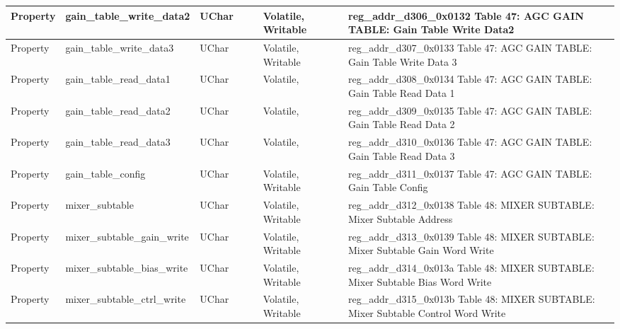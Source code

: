 \documentclass{article}
\begin{document}
\begin{scriptsize}
\begin{longtable}{|p{2cm}|p{5cm}|p{1cm}|p{2cm}|p{2cm}|p{1.75cm}|p{1.5cm}|p{5.1cm}|}
  \hline
  Property & gain\_table\_write\_data2                                & UChar &                  &                  & Volatile,  Writable &         & reg\_addr\_d306\_0x0132 Table 47: AGC GAIN TABLE: Gain Table Write Data2 \\
  \hline
  Property & gain\_table\_write\_data3                                & UChar &                  &                  & Volatile,  Writable &         & reg\_addr\_d307\_0x0133 Table 47: AGC GAIN TABLE: Gain Table Write Data 3 \\
  \hline
  Property & gain\_table\_read\_data1                                 & UChar &                  &                  & Volatile,           &         & reg\_addr\_d308\_0x0134 Table 47: AGC GAIN TABLE: Gain Table Read Data 1 \\
  \hline
  Property & gain\_table\_read\_data2                                 & UChar &                  &                  & Volatile,           &         & reg\_addr\_d309\_0x0135 Table 47: AGC GAIN TABLE: Gain Table Read Data 2 \\
  \hline
  Property & gain\_table\_read\_data3                                 & UChar &                  &                  & Volatile,           &         & reg\_addr\_d310\_0x0136 Table 47: AGC GAIN TABLE: Gain Table Read Data 3 \\
  \hline
  Property & gain\_table\_config                                      & UChar &                  &                  & Volatile,  Writable &         & reg\_addr\_d311\_0x0137 Table 47: AGC GAIN TABLE: Gain Table Config \\
  \hline
  Property & mixer\_subtable                                          & UChar &                  &                  & Volatile,  Writable &         & reg\_addr\_d312\_0x0138 Table 48: MIXER SUBTABLE: Mixer Subtable Address \\
  \hline
  Property & mixer\_subtable\_gain\_write                             & UChar &                  &                  & Volatile,  Writable &         & reg\_addr\_d313\_0x0139 Table 48: MIXER SUBTABLE: Mixer Subtable Gain Word Write \\
  \hline
  Property & mixer\_subtable\_bias\_write                             & UChar &                  &                  & Volatile,  Writable &         & reg\_addr\_d314\_0x013a Table 48: MIXER SUBTABLE: Mixer Subtable Bias Word Write \\
  \hline
  Property & mixer\_subtable\_ctrl\_write                             & UChar &                  &                  & Volatile,  Writable &         & reg\_addr\_d315\_0x013b Table 48: MIXER SUBTABLE: Mixer Subtable Control Word Write \\

\end{longtable}
\end{scriptsize}
\end{document}
